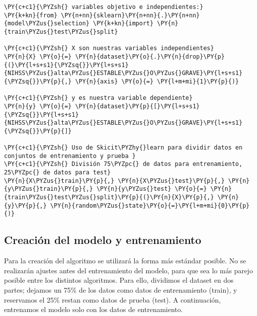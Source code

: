     \begin{tcolorbox}[breakable, size=fbox, boxrule=1pt, pad at break*=1mm,colback=cellbackground, colframe=cellborder]
\begin{Verbatim}[commandchars=\\\{\}]
\PY{c+c1}{\PYZsh{} variables objetivo e independientes:}
\PY{k+kn}{from} \PY{n+nn}{sklearn}\PY{n+nn}{.}\PY{n+nn}{model\PYZus{}selection} \PY{k+kn}{import} \PY{n}{train\PYZus{}test\PYZus{}split}

\PY{c+c1}{\PYZsh{} X son nuestras variables independientes}
\PY{n}{X} \PY{o}{=} \PY{n}{dataset}\PY{o}{.}\PY{n}{drop}\PY{p}{(}\PY{l+s+s1}{\PYZsq{}}\PY{l+s+s1}{NIHSS\PYZus{}alta\PYZus{}ESTABLE\PYZus{}O\PYZus{}GRAVE}\PY{l+s+s1}{\PYZsq{}}\PY{p}{,} \PY{n}{axis} \PY{o}{=} \PY{l+m+mi}{1}\PY{p}{)}

\PY{c+c1}{\PYZsh{} y es nuestra variable dependiente}
\PY{n}{y} \PY{o}{=} \PY{n}{dataset}\PY{p}{[}\PY{l+s+s1}{\PYZsq{}}\PY{l+s+s1}{NIHSS\PYZus{}alta\PYZus{}ESTABLE\PYZus{}O\PYZus{}GRAVE}\PY{l+s+s1}{\PYZsq{}}\PY{p}{]}

\PY{c+c1}{\PYZsh{} Uso de Skicit\PYZhy{}learn para dividir datos en conjuntos de entrenamiento y prueba }
\PY{c+c1}{\PYZsh{} División 75\PYZpc{} de datos para entrenamiento, 25\PYZpc{} de datos para test}
\PY{n}{X\PYZus{}train}\PY{p}{,} \PY{n}{X\PYZus{}test}\PY{p}{,} \PY{n}{y\PYZus{}train}\PY{p}{,} \PY{n}{y\PYZus{}test} \PY{o}{=} \PY{n}{train\PYZus{}test\PYZus{}split}\PY{p}{(}\PY{n}{X}\PY{p}{,} \PY{n}{y}\PY{p}{,} \PY{n}{random\PYZus{}state}\PY{o}{=}\PY{l+m+mi}{0}\PY{p}{)}
\end{Verbatim}
\end{tcolorbox}

    \hypertarget{creaciuxf3n-del-modelo-y-entrenamiento}{%
\subsection{Creación del modelo y entrenamiento}\label{NB:creaciuxf3n-del-modelo-y-entrenamiento}}

	Para la creación del algoritmo se utilizará la forma más estándar posible. No se realizarán ajustes antes del entrenamiento del modelo, para que sea lo más parejo posible entre los distintos algoritmos. Para ello, dividimos el dataset en dos partes; dejamos un 75\% de los datos como datos de entrenamiento (train), y reservamos el 25\% restan como datos de prueba (test).
	A continuación, entrenamos el modelo solo con los datos de entrenamiento. 


